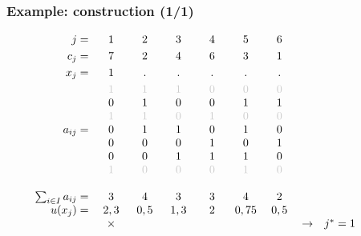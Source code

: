 \documentclass[]{beamer}
\newcommand{\grisc}[1]{\color{black!20}#1}
\begin{document}
\begin{frame}
  \frametitle{Example: construction (1/1)}
\vspace{3mm}

{\small

$
\begin{array}{r cccccccl}
%
j =   & 1 & 2 & 3 & 4 & 5 & 6 \vspace{1mm}\\
c_j =   & 7 & 2 & 4 &  6 & 3 & 1 \vspace{1mm}\\	
x_j =   & 1 & . & . &  . & . & . \vspace{1mm}\\	
  & {\grisc 1} & {\grisc 1} & {\grisc 1} &  {\grisc 0} & {\grisc 0} & {\grisc 0}  \\
  & {0} & { 1} & { 0} &  { 0} & { 1} & { 1}  \\  
  & {\grisc 1} & {\grisc 1} & {\grisc 0} &  {\grisc 1} & {\grisc 0} & {\grisc 0}  \\ 
a_{ij} =  & { 0} & { 1} & { 1} &  { 0} & { 1} & { 0}  \\ 
  & 0 & 0 & 0 &  1 & 0 & 1  \\ 
  & 0 & 0 & 1 &  1 & 1 & 0  \\       
  &  {\grisc 1}  & {\grisc 0} & {\grisc 0} &   {\grisc 0}  & {\grisc 1} & {\grisc 0}  \\
  \\
\qquad \sum_{i\in I} a_{ij} = &	3 &	4 &	3 &	3 &	4 &	2 \\	
u(x_j) = &	2,3 & 0,5 &  1,3 & 2 &  0,75 & 0,5 \\	
               & \times &  &  &  &  &  &  \rightarrow & j^{*} =   1 \vspace{1mm} \\  
\quad & \qquad & \qquad & \qquad & \qquad & \qquad & \qquad & \\
\\ %
\end{array}
$ 
}
 

\end{frame}

%
%
\end{document}

